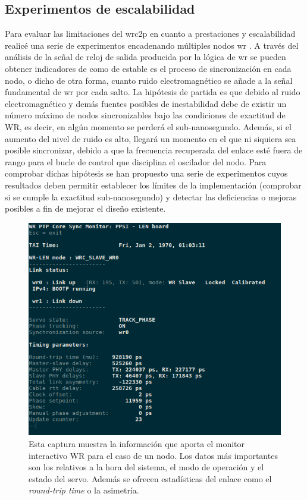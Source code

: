 \subsection{Experimentos de escalabilidad}

Para evaluar las limitaciones del \gls{wrc2p} en cuanto a prestaciones y 
escalabilidad realicé una serie de experimentos encadenando múltiples nodos 
\gls{wr} \cite{felipe16}. A través del análisis de la señal de reloj de salida 
producida por 
la lógica de \gls{wr} se pueden obtener indicadores de como de estable es el 
proceso de sincronización en cada nodo, o dicho de otra forma, cuanto ruido 
electromagnético se añade a la señal fundamental de \gls{wr} por cada salto. La 
hipótesis de partida es que debido al ruido electromagnético y demás fuentes 
posibles de inestabilidad debe de existir un número máximo de nodos 
sincronizables bajo las condiciones de exactitud de WR, es decir, en algún 
momento se perderá el sub-nanosegundo. Además, si el aumento del nivel de ruido 
es alto, llegará un momento en el que ni siquiera sea posible sincronizar, 
debido a que la frecuencia recuperada del enlace esté fuera de rango para el 
bucle de control que disciplina el oscilador del nodo. Para comprobar dichas 
hipótesis se han propuesto una serie de experimentos cuyos resultados deben 
permitir establecer los límites de la implementación 
(comprobar si se cumple la exactitud sub-nanosegundo) y detectar las 
deficiencias o mejoras posibles a fin de mejorar el diseño existente.

\begin{figure}
	\centering
	\includegraphics[width=0.7\linewidth]{imagenes/len_gui}
	\caption[Captura del monitor WR en el dispositivo WR-LEN]{Esta captura 
	muestra la información que aporta el monitor interactivo WR para el caso de 
	un nodo. Los datos más importantes son los relativos a la hora del sistema, 
	el modo de operación y el estado del servo. Además se ofrecen estadísticas 
	del enlace como el \textit{round-trip time} o la asimetría.}
	\label{fig:lengui}
\end{figure}



